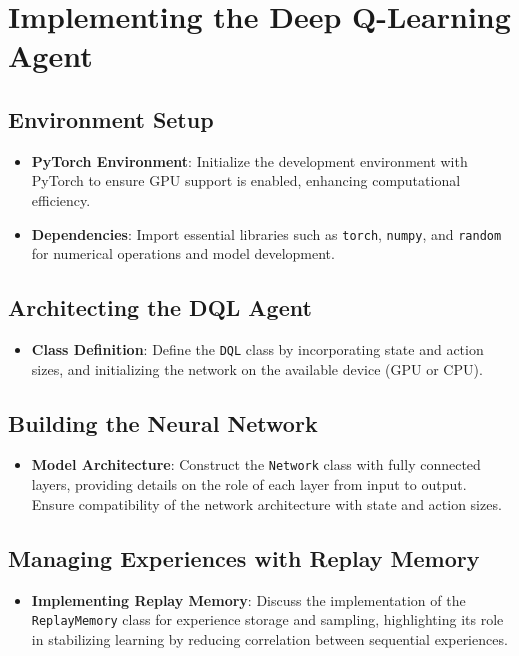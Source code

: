 \section{Implementing the Deep Q-Learning Agent}

\subsection{Environment Setup}
\begin{itemize}
    \item \textbf{PyTorch Environment}: Initialize the development environment with PyTorch to ensure GPU support is enabled, enhancing computational efficiency.
    \item \textbf{Dependencies}: Import essential libraries such as \texttt{torch}, \texttt{numpy}, and \texttt{random} for numerical operations and model development.
\end{itemize}

\subsection{Architecting the DQL Agent}
\begin{itemize}
    \item \textbf{Class Definition}: Define the \texttt{DQL} class by incorporating state and action sizes, and initializing the network on the available device (GPU or CPU).
\end{itemize}

\subsection{Building the Neural Network}
\begin{itemize}
    \item \textbf{Model Architecture}: Construct the \texttt{Network} class with fully connected layers, providing details on the role of each layer from input to output. Ensure compatibility of the network architecture with state and action sizes.
\end{itemize}

\subsection{Managing Experiences with Replay Memory}
\begin{itemize}
    \item \textbf{Implementing Replay Memory}: Discuss the implementation of the \texttt{ReplayMemory} class for experience storage and sampling, highlighting its role in stabilizing learning by reducing correlation between sequential experiences.
\end{itemize}

